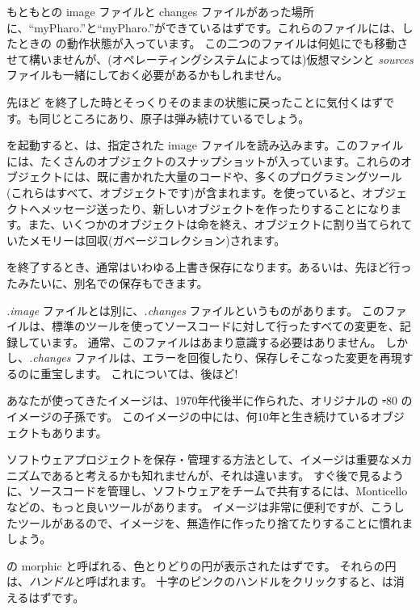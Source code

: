 \documentclass[a4paper,10pt,twoside]{book}
\begin{document}
もともとの image ファイルと changes ファイルがあった場所に、``myPharo.''と``myPharo.''ができているはずです。これらのファイルには、したときの \pharo の動作状態が入っています。
この二つのファイルは何処にでも移動させて構いませんが、(オペレーティングシステムによっては)仮想マシンと \emph{sources} ファイルも一緒にしておく必要があるかもしれません。


先ほど \pharo を終了した時とそっくりそのままの状態に戻ったことに気付くはずです。\bam も同じところにあり、原子は弾み続けているでしょう。

\pharo を起動すると、\pharo {}は、指定された image ファイルを読み込みます。このファイルには、たくさんのオブジェクトのスナップショットが入っています。これらのオブジェクトには、既に書かれた大量のコードや、多くのプログラミングツール(これらはすべて、オブジェクトです)が含まれます。\pharo を使っていると、オブジェクトへメッセージ送ったり、新しいオブジェクトを作ったりすることになります。また、いくつかのオブジェクトは命を終え、オブジェクトに割り当てられていたメモリーは回収(\ie ガベージコレクション)されます。

\pharo を終了するとき、通常はいわゆる上書き保存になります。あるいは、先ほど行ったみたいに、別名での保存もできます。

\emph{.image} ファイルとは別に、\emph{.changes} ファイルというものがあります。
このファイルは、標準のツールを使ってソースコードに対して行ったすべての変更を、記録しています。
通常、このファイルはあまり意識する必要はありません。
しかし、\emph{.changes} ファイルは、エラーを回復したり、保存しそこなった変更を再現するのに重宝します。
これについては、後ほど!

あなたが使ってきたイメージは、1970年代後半に作られた、オリジナルの \st-80 のイメージの子孫です。
このイメージの中には、何10年と生き続けているオブジェクトもあります。

ソフトウェアプロジェクトを保存・管理する方法として、イメージは重要なメカニズムであると考えるかも知れませんが、それは違います。
すぐ後で見るように、ソースコードを管理し、ソフトウェアをチームで共有するには、Monticello などの、もっと良いツールがあります。
イメージは非常に便利ですが、こうしたツールがあるので、イメージを、無造作に作ったり捨てたりすることに慣れましょう。

\bam の morphic  と呼ばれる、色とりどりの円が表示されたはずです。
それらの円は、\emph{ハンドル}と呼ばれます。
十字のピンクのハンドルをクリックすると、\bam は消えるはずです。
\end{document}
